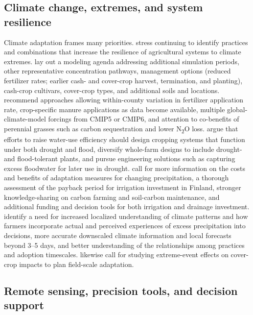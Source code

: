 \documentclass[11pt]{article}
\begin{document}
\subsection{Climate change, extremes, and system resilience}

Climate adaptation frames many priorities. \textcite{Saha2024} stress continuing to identify practices and combinations that increase the resilience of agricultural systems to climate extremes. \textcite{Malone2020} lay out a modeling agenda addressing additional simulation periods, other representative concentration pathways, management options (reduced fertilizer rates; earlier cash- and cover-crop harvest, termination, and planting), cash-crop cultivars, cover-crop types, and additional soils and locations. \textcite{Ferin2023} recommend approaches allowing within-county variation in fertilizer application rate, crop-specific manure applications as data become available, multiple global-climate-model forcings from CMIP5 or CMIP6, and attention to co-benefits of perennial grasses such as carbon sequestration and lower N\textsubscript{2}O loss. \textcite{Dietzel2016} argue that efforts to raise water-use efficiency should design cropping systems that function under both drought and flood, diversify whole-farm designs to include drought- and flood-tolerant plants, and pursue engineering solutions such as capturing excess floodwater for later use in drought. \textcite{PeltonenSainio2021} call for more information on the costs and benefits of adaptation measures for changing precipitation, a thorough assessment of the payback period for irrigation investment in Finland, stronger knowledge-sharing on carbon farming and soil-carbon maintenance, and additional funding and decision tools for both irrigation and drainage investment. \textcite{Morton2015} identify a need for increased localized understanding of climate patterns and how farmers incorporate actual and perceived experiences of excess precipitation into decisions, more accurate downscaled climate information and local forecasts beyond 3--5 days, and better understanding of the relationships among practices and adoption timescales. \textcite{Gupta2023b} likewise call for studying extreme-event effects on cover-crop impacts to plan field-scale adaptation.

\subsection{Remote sensing, precision tools, and decision support}
\end{document}
